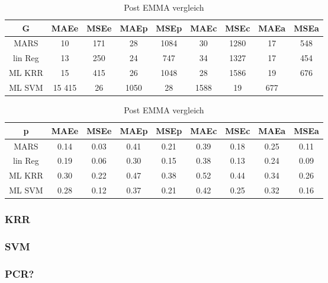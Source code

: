 \begin{table}[htb]
	\centering
    \caption{Post EMMA vergleich}
	\label{tab:post-emma}
	\begin{tabular}{c cc cc cc cc}
    \hline\hline
    G&  MAEe&   MSEe&   MAEp&   MSEp&   MAEc&   MSEc&   MAEa& MSEa \\
    \hline
        MARS&   10& 171&    28& 1084&   30& 1280&   17& 548\\
        lin Reg&    13& 250&    24& 747&    34& 1327&   17& 454\\
        ML KRR& 15& 415&    26& 1048&   28& 1586&   19& 676\\
        ML SVM& 15  415&    26& 1050&   28& 1588&   19& 677\\
    \hline\hline
	\end{tabular}
	\begin{tabular}{c cc cc cc cc}
    \hline\hline
    p&  MAEe&   MSEe&   MAEp&   MSEp&   MAEc&   MSEc&   MAEa& MSEa \\
    \hline
        MARS&   0.14&   0.03&   0.41&   0.21&   0.39&   0.18&   0.25&   0.11\\
        lin Reg&    0.19&   0.06&   0.30&   0.15&   0.38&   0.13&   0.24&   0.09\\
        ML KRR& 0.30&   0.22&   0.47&   0.38&   0.52&   0.44&   0.34&   0.26\\
        ML SVM& 0.28&   0.12&   0.37&   0.21&   0.42&   0.25&   0.32&   0.16\\
    \hline\hline
	\end{tabular}
\end{table}
    

\subsubsection{KRR}

\subsubsection{SVM}

\subsubsection{PCR?}

